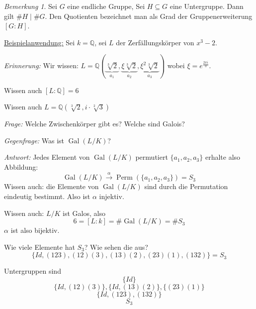 \documentclass[12pt,parskip=full]{scrartcl}
\newcommand{\setQ}{\mathbb{Q}}
\newcommand{\heading}{\underline}
\DeclareMathOperator{\Gal}{Gal}
\theoremstyle{definition}
\theoremstyle{remark}
\newtheorem*{remark}{Bemerkung}
\begin{document}
	\begin{remark}
		Sei $G$ eine endliche Gruppe, Sei $H \subseteq G$ eine Untergruppe. Dann gilt $\#H \mid \#G$. Den Quotienten bezeichnet man als Grad der Gruppenerweiterung $[G:H]$.
	\end{remark}

	\heading{Beispielanwendung:} Sei $k = \setQ$, sei $L$ der Zerfällungskörper von $x^3 - 2$.
	
	\textit{Erinnerung:} Wir wissen: $L = \setQ(\underbrace{\sqrt[3]{2}}_{a_1}, \underbrace{\xi \sqrt[3]{2}}_{a_2}, \underbrace{\xi^2 \sqrt[3]{2}}_{a_3})$ wobei $\xi = e^{\frac{2 \pi i}{3}}$.
	
	Wissen auch $[L: \setQ] = 6$
	
	Wissen auch $L = \setQ(\sqrt[3]{2}, i \cdot \sqrt[2]{3})$
	
	\textit{Frage:} Welche Zwischenkörper gibt es? Welche sind Galois?
	
	\textit{Gegenfrage:} Was ist $\Gal(L/K)$?
	
	\textit{Antwort:} Jedes Element von $\Gal(L/K)$ permutiert $\{ a_1, a_2, a_3 \}$ erhalte also Abbildung:
	\begin{equation*}
		\Gal(L/K) \overset{\alpha}{\to} \operatorname{Perm}(\{ a_1, a_2, a_3 \}) = S_3
	\end{equation*}
	Wissen auch: die Elemente von $\Gal(L/K)$ sind durch die Permutation eindeutig bestimmt. Also ist $\alpha$ injektiv.
	
	Wissen auch: $L/K$ ist Galos, also
	\begin{equation*}
		6 = [L:k] = \#\Gal(L/K) = \#S_3
	\end{equation*}
	$\alpha$ ist also bijektiv.
	
	Wie viele Elemente hat $S_3$? Wie sehen die aus?
	\begin{equation*}
		\{ Id, (123), (12)(3), (13)(2), (23)(1), (132) \} = S_3
	\end{equation*}
	
	Untergruppen sind
	\begin{equation*}
		\{ Id \}
	\end{equation*}
	\begin{equation*}
		\{ Id, (12)(3) \}, \{ Id, (13)(2) \}, \{ (23)(1) \}
	\end{equation*}
	\begin{equation*}
		\{ Id, (123), (132) \}
	\end{equation*}
	\begin{equation*}
		S_3
	\end{equation*}
	
\end{document}
